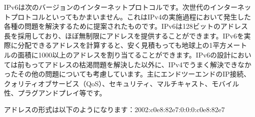 IPv6は次のバージョンのインターネットプロトコルです。次世代のインターネットプロトコルといってもかまいません。これはIPv4の実施過程において発生した各種の問題を解決するために提案されたものです。IPv6は128ビットのアドレス長を採用しており、ほぼ無制限にアドレスを提供することができます。IPv6を実際に分配できるアドレスを計算すると、安く見積もっても地球上の1平方メートルの面積に1000以上のアドレスを割り当てることができます。IPv6の設計においては前もってアドレスの枯渇問題を解決した以外に、IPv4でうまく解決できなかったその他の問題についても考慮しています。主にエンドツーエンドのIP接続、クォリティオブサービス（QoS）、セキュリティ、マルチキャスト、モバイル性、プラグアンドプレイ等です。

アドレスの形式は以下のようになります：2002:c0e8:82e7:0:0:0:c0e8:82e7
